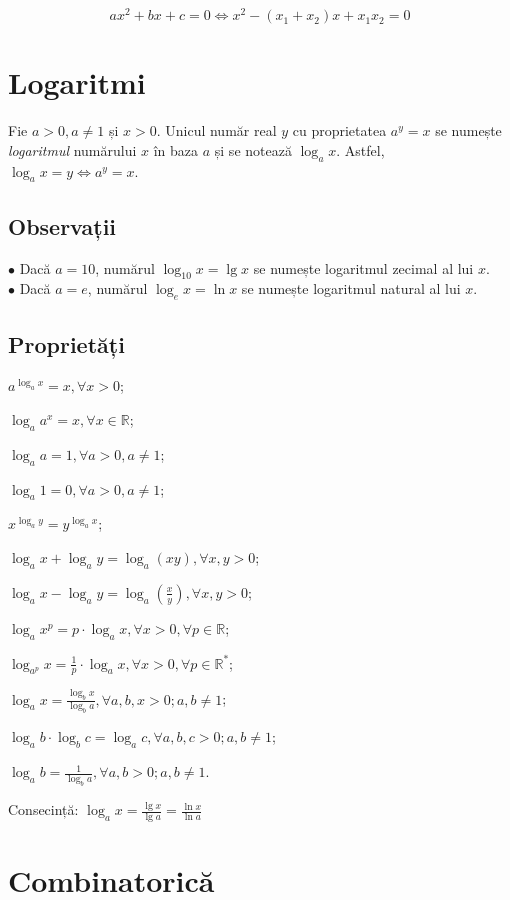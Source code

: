 \documentclass[11pt,a4paper]{article}
\begin{document}
  $$ax^2+bx+c=0 \Longleftrightarrow x^2 - (x_1+x_2)x +x_1x_2 = 0$$
  \section{Logaritmi}
  Fie $a>0, a \neq 1$ și $x>0$. Unicul număr real $y$ cu proprietatea $a^y=x$ se numește \textit{logaritmul} numărului $x$ în baza $a$ și se notează $\log_a x$.
  Astfel, $\log_a x = y \Leftrightarrow a^y = x$.
  \subsection{Observații}
  $\bullet$ Dacă $a = 10$, numărul $\log_{10} x = \lg x$ se numește logaritmul zecimal al lui $x$.\\
  $\bullet$ Dacă $a = e$, numărul $\log_e x = \ln x$ se numește logaritmul natural al lui $x$.
  \subsection{Proprietăți}
  \begin{Properties}
  \item $a^{\log_a x} = x, \forall x > 0$;
  \item $\log_a a^x = x, \forall x \in \mathbb{R}$;
  \item $\log_a a = 1, \forall a > 0, a \neq 1$;
  \item $\log_a 1 = 0, \forall a > 0, a \neq 1$;
  \item $x^{\log_a y}= y^{\log_a x}$;
  \item $\log_ax + \log_ay = \log_a(xy), \forall x, y > 0$;
  \item $\log_ax - \log_ay = \log_a(\frac{x}{y}), \forall x, y > 0$;
  \item $\log_ax^p = p \cdot \log_ax, \forall x > 0, \forall p \in \mathbb{R}$;
  \item $\log_{a^p}x = \frac{1}{p} \cdot \log_ax, \forall x > 0, \forall p \in \mathbb{R}^*$;
  \item $\log_ax = \frac{\log_bx}{\log_ba}, \forall a, b, x > 0; a, b \neq	 1$;
  \item $\log_ab \cdot \log_bc = \log_ac, \forall a, b, c > 0; a, b \neq 1$;
  \item $\log_ab = \frac{1}{\log_ba}, \forall a, b > 0; a, b \neq 1$.
  \end{Properties}
  Consecință: $\log_ax = \frac{\lg x }{\lg a} = \frac{\ln x }{\ln a}$

  \section{Combinatorică}
\end{document}

